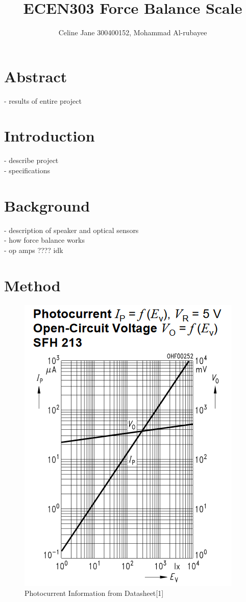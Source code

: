 \documentclass[12pt]{article}
\title{ECEN303 Force Balance Scale}
\author{Celine Jane  300400152, Mohammad Al-rubayee}
\begin{document}
	\maketitle
	\section{Abstract}
	- results of entire project 
	\section{Introduction}
	- describe project \\
	- specifications
	\section{Background}
	- description of speaker and optical sensors\\
	- how force balance works \\
	- op amps ???? idk
	
	\newpage
	
	\section{Method}
	
	\begin{figure}
		\centering
		\includegraphics{photocurrent}
		\caption{Photocurrent Information from Datasheet[1]}
		
	\end{figure}
	
\end{document}
